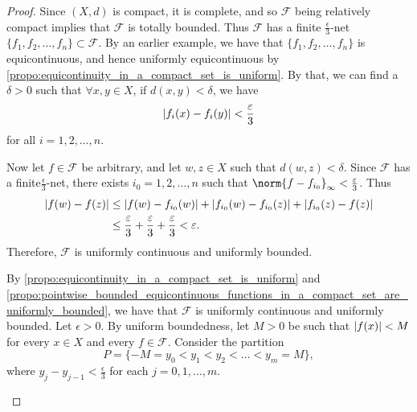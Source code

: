 \documentclass[notoc,notitlepage]{tufte-book}
\begin{document}
\begin{proof}
   Since $(X, d)$ is compact, it is complete, and so $\mathcal{F}$ being relatively compact implies that $\mathcal{F}$ is totally bounded. Thus $\mathcal{F}$ has a finite $\frac{\epsilon}{3}$-net $\{ f_1, f_2, \ldots, f_n \} \subset \mathcal{F}$. By an earlier example, we have that $\{ f_1, f_2, \ldots, f_n \}$ is equicontinuous, and hence uniformly equicontinuous by \cref{propo:equicontinuity_in_a_compact_set_is_uniform}. By that, we can find a $\delta > 0$ such that $\forall x, y \in X$, if $d(x, y) < \delta$, we have
  \begin{equation*}
    \left| f_i(x) - f_i(y) \right| < \frac{\varepsilon}{3}
  \end{equation*}
  for all $i = 1, 2, \ldots, n$.

  Now let $f \in \mathcal{F}$ be arbitrary, and let $w, z \in X$ such that $d(w, z) < \delta$. Since $\mathcal{F}$ has a finite$\frac{\epsilon}{3}$-net, there exists $i_0 = 1, 2, \ldots, n$ such that $\norm{ f - f_{i_0} }_\infty < \frac{\epsilon}{3}$. Thus
  \begin{align*}
    \left| f(w) - f(z) \right| &\leq \left| f(w) - f_{i_0}(w) \right| + \left| f_{i_0}(w) - f_{i_0}(z) \right| + \left| f_{i_0}(z) - f(z) \right| \\
                        &\leq \frac{\varepsilon}{3} + \frac{\varepsilon}{3} + \frac{\varepsilon}{3} < \varepsilon.
  \end{align*}
  Therefore, $\mathcal{F}$ is uniformly continuous and uniformly bounded.

  \noindent
   By \cref{propo:equicontinuity_in_a_compact_set_is_uniform} and \cref{propo:pointwise_bounded_equicontinuous_functions_in_a_compact_set_are_uniformly_bounded}, we have that $\mathcal{F}$ is uniformly continuous and uniformly bounded. Let $\epsilon > 0$. By uniform boundedness, let $M > 0$ be such that $\left|f(x)\right| < M$ for every $x \in X$ and every $f \in \mathcal{F}$. Consider the partition
  \begin{equation*}
    P = \{ -M = y_0 < y_1 < y_2 < \ldots < y_m = M \},
  \end{equation*}
  where $y_j - y_{j - 1} < \frac{\epsilon}{3}$ for each $j = 0, 1, \ldots, m$.
  \begin{marginfigure}
    \centering
\end{marginfigure}
\end{proof}
\end{document}
